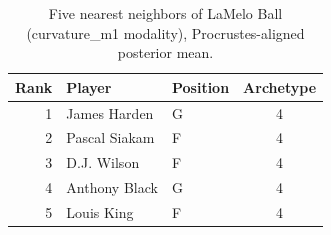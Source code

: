 \begin{table}[htbp]
  \centering\small
  \begin{tabular}{rllc}
    \toprule
    Rank & Player & Position & Archetype \\
    \midrule
    1 & James Harden & G & 4 \\
    2 & Pascal Siakam & F & 4 \\
    3 & D.J. Wilson & F & 4 \\
    4 & Anthony Black & G & 4 \\
    5 & Louis King & F & 4 \\
    \bottomrule
  \end{tabular}
  \caption{Five nearest neighbors of LaMelo Ball (curvature_m1 modality), Procrustes-aligned posterior mean.}
  \label{tab:LaMelo_Ball_neighbors_curvature_m1}
\end{table}

